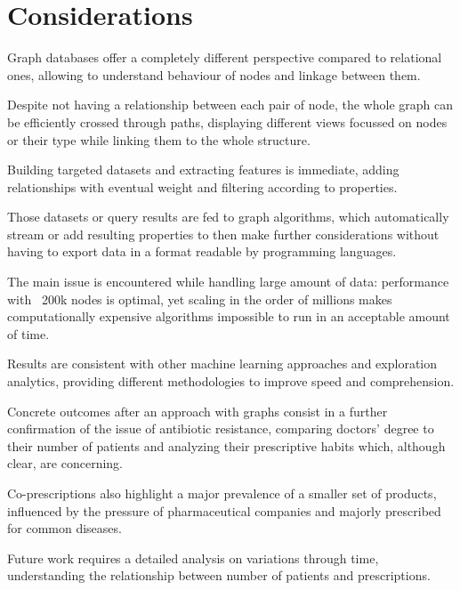 \section{Considerations}
Graph databases offer a completely different perspective compared to relational ones, allowing to understand behaviour of nodes and linkage between them.

Despite not having a relationship between each pair of node, the whole graph can be efficiently crossed through paths, displaying different views focussed on nodes or their type while linking them to the whole structure. 

Building targeted datasets and extracting features is immediate, adding relationships with eventual weight and filtering according to properties.

Those datasets or query results are fed to graph algorithms, which automatically stream or add resulting properties to then make further considerations without having to export data in a format readable by programming languages.

The main issue is encountered while handling large amount of data: performance with ~200k nodes is optimal, yet scaling in the order of millions makes computationally expensive algorithms impossible to run in an acceptable amount of time.

Results are consistent with other machine learning approaches and exploration analytics, providing different methodologies to improve speed and comprehension.

Concrete outcomes after an approach with graphs consist in a further confirmation of the issue of antibiotic resistance, comparing doctors' degree to their number of patients and analyzing their prescriptive habits which, although clear, are concerning.

Co-prescriptions also highlight a major prevalence of a smaller set of products, influenced by the pressure of pharmaceutical companies and majorly prescribed for common diseases. 

Future work requires a detailed analysis on variations through time, understanding the relationship between number of patients and prescriptions. 

